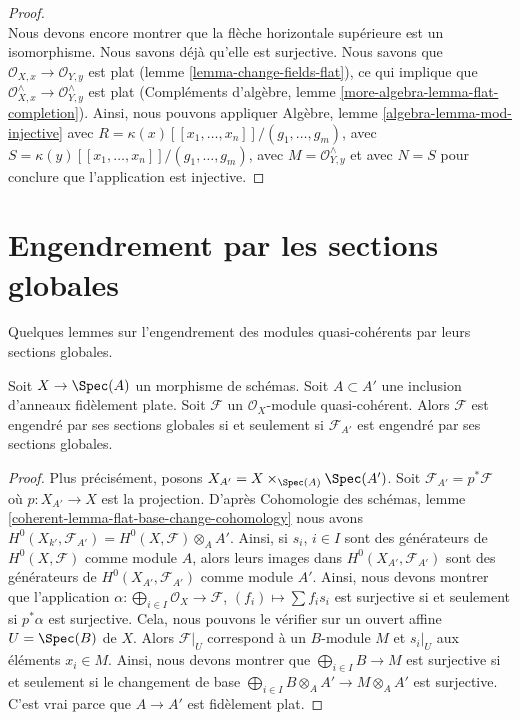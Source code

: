 \begin{proof}
$${}
$$
Nous devons encore montrer que la flèche horizontale supérieure
est un isomorphisme. Nous savons déjà qu'elle est surjective.
Nous savons que $\mathcal{O}_{X, x} \to \mathcal{O}_{Y, y}$ est
plat (lemme \ref{lemma-change-fields-flat}), ce qui implique
que $\mathcal{O}_{X, x}^\wedge \to \mathcal{O}_{Y, y}^\wedge$
est plat (Compléments d'algèbre, lemme
\ref{more-algebra-lemma-flat-completion}). Ainsi, nous pouvons
appliquer Algèbre, lemme \ref{algebra-lemma-mod-injective} avec $R =
\kappa(x)[[x_1, \ldots, x_n]]/(g_1, \ldots, g_m)$, avec $S =
\kappa(y)[[x_1, \ldots, x_n]]/(g_1, \ldots, g_m)$, avec $M =
\mathcal{O}_{Y, y}^\wedge$ et avec $N = S$ pour conclure que l'application est injective.
\end{proof}


\section{Engendrement par les sections globales}
\label{section-global-generation}

\noindent
Quelques lemmes sur l'engendrement des modules quasi-cohérents par leurs sections globales.

\begin{lemma}
\label{lemma-globally-generated-base-change}
Soit $X \to \Spec(A)$ un morphisme de schémas. Soit $A \subset
A'$ une inclusion d'anneaux fidèlement plate. Soit $\mathcal{F}$
un $\mathcal{O}_X$-module quasi-cohérent. Alors $\mathcal{F}$ est engendré par ses sections globales
si et seulement si $\mathcal{F}_{A'}$ est engendré par ses sections globales.
\end{lemma}

\begin{proof}
Plus précisément, posons $X_{A'} = X \times_{\Spec(A)}
\Spec(A')$. Soit $\mathcal{F}_{A'} = p^*\mathcal{F}$ où $p :
X_{A'} \to X$ est la projection. D'après Cohomologie des
schémas, lemme
\ref{coherent-lemma-flat-base-change-cohomology} nous avons
$H^0(X_{k'}, \mathcal{F}_{A'}) = H^0(X, \mathcal{F}) \otimes_A
A'$. Ainsi, si $s_i$, $i \in I$ sont des générateurs de $H^0(X,
\mathcal{F})$ comme module $A$, alors leurs images dans
$H^0(X_{A'}, \mathcal{F}_{A'})$ sont des générateurs de
$H^0(X_{A'}, \mathcal{F}_{A'})$ comme module $A'$. Ainsi, nous
devons montrer que l'application $\alpha : \bigoplus_{i \in I}
\mathcal{O}_X \to \mathcal{F}$, $(f_i) \mapsto \sum f_i s_i$ est
surjective si et seulement si $p^*\alpha$ est surjective. Cela,
nous pouvons le vérifier sur un ouvert affine $U = \Spec(B)$ de
$X$. Alors $\mathcal{F}|_U$ correspond à un $B$-module $M$ et
$s_i|_U$ aux éléments $x_i \in M$. Ainsi, nous devons montrer que
$\bigoplus_{i \in I} B \to M$ est surjective si et seulement si le
changement de base $\bigoplus_{i \in I} B \otimes_A A' \to M \otimes_A
A'$ est surjective. C'est vrai parce que $A \to A'$ est fidèlement plat.
\end{proof}


